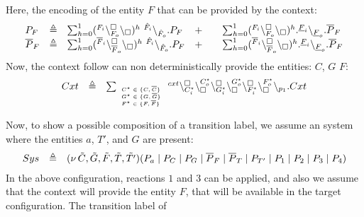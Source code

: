 Here, the encoding of the entity $F$ that can be provided by the context:
\[
\begin{array}{lcllcl}
P_F&\triangleq & \sum_{h=0}^1 ({}^{F_i}\backslash_{F_o}^{\scriptstyle {\square}}\backslash_{\scriptstyle {\square}})^h\ {}^{\hat{F}_i} \backslash_{\hat{F}_o}.P_F
& +  && \sum_{h=0}^1 ({}^{F_i}\backslash_{F_o}^{\scriptstyle {\square}}\backslash_{\scriptstyle {\square}})^h. {}^{\underline{F}_i} \backslash_{\underline{F}_o}.\overline{P}_F \\
\overline{P}_F&\triangleq & \sum_{h=0}^1 ({}^{\overline{F}_i}\backslash_{\overline{F}_o}^{\scriptstyle {\square}}\backslash_{\scriptstyle {\square}})^h\ {}^{\hat{F}_i} \backslash_{\hat{F}_o}.P_F
& +  && \sum_{h=0}^1 ({}^{\overline{F}_i}\backslash_{\overline{F}_o}^{\scriptstyle {\square}}\backslash_{\scriptstyle {\square}})^h. {}^{\underline{F}_i} \backslash_{\underline{F}_o}.\overline{P}_F \\
\end{array}
\]
Now, the context follow can non deterministically provide the entities: $C$, $G$ $F$:\\
\[
\begin{array}{lcl}
 Cxt & \triangleq &
 \sum_{\tiny \begin{array}{l}C^{\star} \in \{C,\overline{C}\}\\G^{\star} \in \{G,\overline{G}\}\\
 F^{\star} \in \{F,\overline{F}\}
  \end{array}}
 {}^{cxt} \backslash_{C_i^{\star}}^{\scriptstyle {\square}}\backslash_{\scriptstyle {\square}}^{C_o^{\star}}\backslash_{G_i^{\star}}^{\scriptstyle {\square}}\backslash_{\scriptstyle {\square}}^{G_o^{\star}}
 \backslash_{F_i^{\star}}^{\scriptstyle {\square}}\backslash_{\scriptstyle {\square}}^{F_o^{\star}}\backslash_{p_1}.Cxt\\
\end{array}
\]

Now, to show a possible composition of a transition label, we assume an system where the entities $a$, $T'$, and $G$ are present:
\[
\begin{array}{lcl}
Sys &\triangleq &(\nu\, \tilde{C},\tilde{G},\tilde{F}, \tilde{T},\tilde{T'})( P_a\mid P_C\mid P_G\mid \overline{P}_F \mid \overline{P}_T \mid P_{T'} \mid P_1 \mid P_2 \mid P_3 \mid P_4)
\end{array}
\]
In the above configuration, reactions $1$ and $3$ can be applied, and also we assume that the context will provide the entity $F$, that will be available in the target configuration.
The transition label of 



